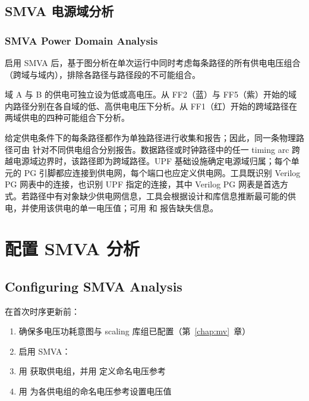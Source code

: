 \subsection{SMVA 电源域分析}
\subsubsection*{SMVA Power Domain Analysis}

启用 SMVA 后，基于图分析在单次运行中同时考虑每条路径的所有供电电压组合（跨域与域内），排除各路径与路径段的不可能组合。


域 A 与 B 的供电可独立设为低或高电压。从 FF2（蓝）与 FF5（紫）开始的域内路径分别在各自域的低、高供电电压下分析。从 FF1（红）开始的跨域路径在两域供电的四种可能组合下分析。

给定供电条件下的每条路径都作为单独路径进行收集和报告；因此，同一条物理路径可由  针对不同供电组合分别报告。数据路径或时钟路径中的任一 timing arc 跨越电源域边界时，该路径即为跨域路径。UPF 基础设施确定电源域归属；每个单元的 PG 引脚都应连接到供电网，每个端口也应定义供电网。工具既识别 Verilog PG 网表中的连接，也识别 UPF  指定的连接，其中 Verilog PG 网表是首选方式。若路径中有对象缺少供电网信息，工具会根据设计和库信息推断最可能的供电，并使用该供电的单一电压值；可用  和  报告缺失信息。

\section{配置 SMVA 分析}
\subsection*{Configuring SMVA Analysis}

在首次时序更新前：
\begin{enumerate}
  \item 确保多电压功耗意图与 scaling 库组已配置（第~\ref{chap:mv}~章）
  \item 启用 SMVA：
  \item 用  获取供电组，并用  定义命名电压参考
  \item 用  为各供电组的命名电压参考设置电压值
\end{enumerate}

